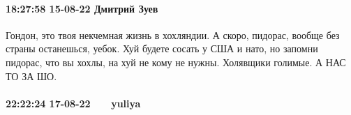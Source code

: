  
 
 
 
 

\paragraph{18:27:58 15-08-22 Дмитрий Зуев}

Гондон, это твоя некчемная жизнь в хохляндии. А скоро, пидорас, вообще без
страны останешься, уебок. Хуй будете сосать у США и нато, но запомни пидорас,
что вы хохлы, на хуй не кому не нужны. Холявщики голимые. А НАС ТО ЗА ШО.

\paragraph{22:22:24 17-08-22 ~~~yuliya ~~~}

